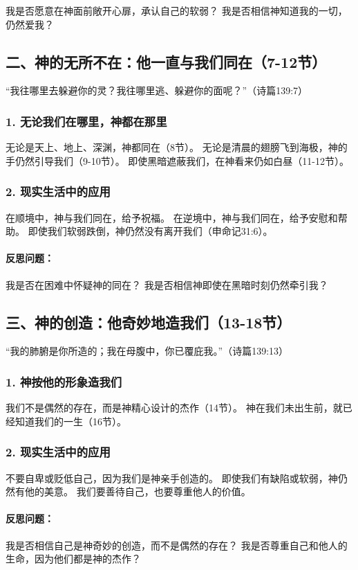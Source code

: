 \documentclass[a4paper, 12pt]{article}
\begin{document}
我是否愿意在神面前敞开心扉，承认自己的软弱？
我是否相信神知道我的一切，仍然爱我？
\subsection*{二、神的无所不在：他一直与我们同在（7-12节）}
“我往哪里去躲避你的灵？我往哪里逃、躲避你的面呢？”（诗篇139:7）

\subsubsection*{1. 无论我们在哪里，神都在那里}
无论是天上、地上、深渊，神都同在（8节）。
无论是清晨的翅膀飞到海极，神的手仍然引导我们（9-10节）。
即使黑暗遮蔽我们，在神看来仍如白昼（11-12节）。
\subsubsection*{2. 现实生活中的应用}
在顺境中，神与我们同在，给予祝福。
在逆境中，神与我们同在，给予安慰和帮助。
即使我们软弱跌倒，神仍然没有离开我们（申命记31:6）。
\paragraph*{反思问题：}

我是否在困难中怀疑神的同在？
我是否相信神即使在黑暗时刻仍然牵引我？
\subsection*{三、神的创造：他奇妙地造我们（13-18节）}
“我的肺腑是你所造的；我在母腹中，你已覆庇我。”（诗篇139:13）

\subsubsection*{1. 神按他的形象造我们}
我们不是偶然的存在，而是神精心设计的杰作（14节）。
神在我们未出生前，就已经知道我们的一生（16节）。
\subsubsection*{2. 现实生活中的应用}
不要自卑或贬低自己，因为我们是神亲手创造的。
即使我们有缺陷或软弱，神仍然有他的美意。
我们要善待自己，也要尊重他人的价值。
\paragraph*{反思问题：}

我是否相信自己是神奇妙的创造，而不是偶然的存在？
我是否尊重自己和他人的生命，因为他们都是神的杰作？
\end{document}

